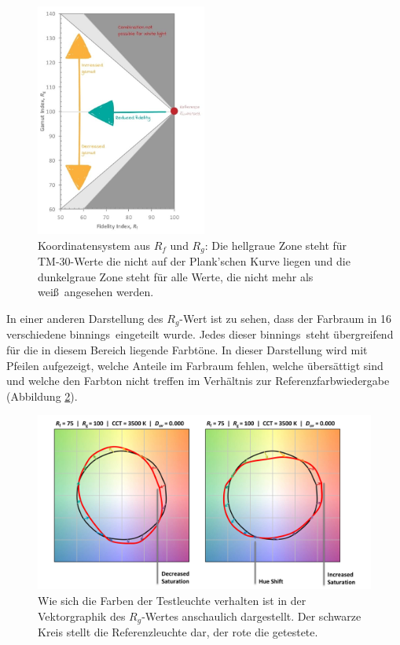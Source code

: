 \begin{figure}[H]     %
\centering
\includegraphics[width=0.5\textwidth]{bilder/tm302} 
\caption {Koordinatensystem aus $R_{f}$ und $R_{g}$: Die hellgraue Zone steht für TM-30-Werte die nicht auf der Plank'schen Kurve liegen und die dunkelgraue Zone steht für alle Werte, die nicht mehr als \glqq weiß\grqq\ angesehen werden. \protect\footnotemark}\label{b_tm302}
\end{figure}

In einer anderen Darstellung des $R_{g}$-Wert ist zu sehen, dass der Farbraum in 16 verschiedene \glqq binnings\grqq\ eingeteilt wurde. Jedes dieser \glqq binnings\grqq\ steht übergreifend für die in diesem Bereich liegende Farbtöne. In dieser Darstellung wird mit Pfeilen aufgezeigt, welche Anteile im Farbraum fehlen, welche übersättigt sind und welche den Farbton nicht treffen im Verhältnis zur Referenzfarbwiedergabe (Abbildung \ref{b_tm303}).

\begin{figure}[htp]     %
\centering
\includegraphics[width=1.0\textwidth]{bilder/tm303} 
\caption {Wie sich die Farben der Testleuchte verhalten ist in der Vektorgraphik des $R_{g}$-Wertes anschaulich dargestellt. Der schwarze Kreis stellt die Referenzleuchte dar, der rote die getestete.  \protect\footnotemark}\label{b_tm303}
\end{figure}

